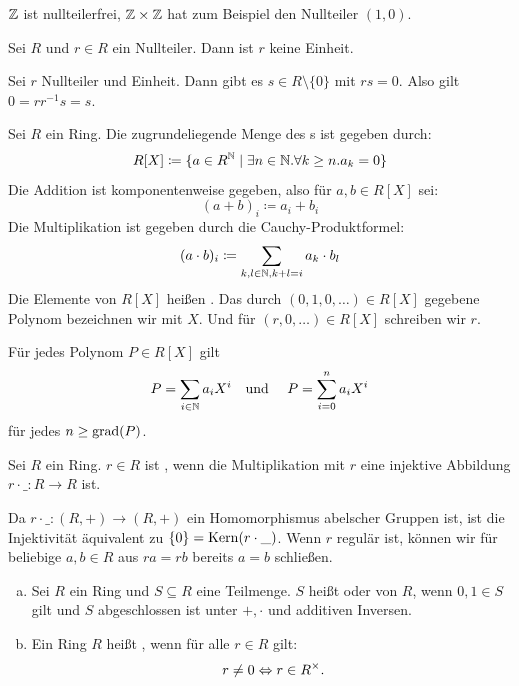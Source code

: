 \begin{beispiel}
  \(\mathbb{Z}\) ist nullteilerfrei, \(\mathbb{Z}\times \mathbb{Z}\) hat zum Beispiel den Nullteiler \((1,0)\).
\end{beispiel}

\begin{bemerkung}
  Sei \(R\) und \(r\in R\) ein Nullteiler. Dann ist \(r\) keine Einheit.
\end{bemerkung}

\begin{beweis}
  Sei \(r\) Nullteiler und Einheit. Dann gibt es \(s\in R\setminus\{0\}\) mit \(rs=0\).
  Also gilt \(0=rr^{-1}s=s\).
\end{beweis}

\begin{definition}
Sei \(R\) ein Ring. Die zugrundeliegende Menge des s ist gegeben durch:
\[
  R[X]\coloneq \{a\in R^{\mathbb{N}}\mid \exists n\in \mathbb{N}. \forall k\geq n. a_k=0\}
\]
Die Addition ist komponentenweise gegeben, also für \(a,b\in R[X]\) sei:
\[
  (a+b)_i\coloneq a_i+b_i
\]
Die Multiplikation ist gegeben durch die Cauchy-Produktformel:
\[
  (a\cdot b)_i\coloneq \sum_{k,l\in\mathbb{N}, k+l=i}a_k\cdot b_l
\]
Die Elemente von \(R[X]\) heißen .
Das durch \((0,1,0,\dots)\in R[X]\) gegebene Polynom bezeichnen wir mit \(X\).
Und für \((r,0,\dots)\in R[X]\) schreiben wir \(r\).
\end{definition}

\begin{bemerkung}
Für jedes Polynom \(P\in R[X]\) gilt
\[
  P=\sum_{i\in \mathbb{N}}a_iX^i\text{\quad und \quad} P=\sum_{i=0}^na_iX^i
\]
für jedes \(n\geq \mathrm{grad}(P)\).
\end{bemerkung}

\begin{definition}
  Sei \(R\) ein Ring. \(r\in R\) ist ,
  wenn die Multiplikation mit \(r\) eine injektive Abbildung \(r\cdot\_:R\to R\) ist.
\end{definition}

Da \(r\cdot\_:(R,+)\to (R,+)\) ein Homomorphismus abelscher Gruppen ist,
ist die Injektivität äquivalent zu \(\{0\}=\mathrm{Kern}(r\cdot\_)\).
Wenn \(r\) regulär ist, können wir für beliebige \(a,b\in R\) aus \(ra=rb\) bereits
\(a=b\) schließen.

\begin{definition}
  \begin{enumerate}[(a)]
  \item Sei \(R\) ein Ring und \(S\subseteq R\) eine Teilmenge.
  \(S\) heißt  oder  von \(R\),
  wenn \(0,1\in S\) gilt und \(S\) abgeschlossen ist unter \(+,\cdot\) und additiven Inversen.
\item Ein Ring \(R\) heißt , wenn für alle \(r\in R\) gilt:
  \[ r\neq 0 \Leftrightarrow r\in R^\times\rlap{.} \]
  \end{enumerate}
\end{definition}


